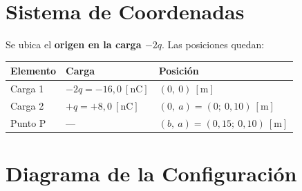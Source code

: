 \documentclass[12pt,letterpaper]{article}
\begin{document}
\section*{Sistema de Coordenadas}

Se ubica el \textbf{origen en la carga $-2q$}. Las posiciones quedan:

\begin{center}
\begin{tabular}{lll}
    \hline
    \textbf{Elemento} & \textbf{Carga} & \textbf{Posici\'on} \\
    \hline
    Carga 1 & $-2q = -16{,}0\ [\text{nC}]$ & $(0,\ 0)\ [\text{m}]$ \\
    Carga 2 & $+q = +8{,}0\ [\text{nC}]$   & $(0,\ a) = (0;\ 0{,}10)\ [\text{m}]$ \\
    Punto P &  ---                           & $(b,\ a) = (0{,}15;\ 0{,}10)\ [\text{m}]$ \\
    \hline
\end{tabular}
\end{center}

\section*{Diagrama de la Configuraci\'on}
\end{document}
